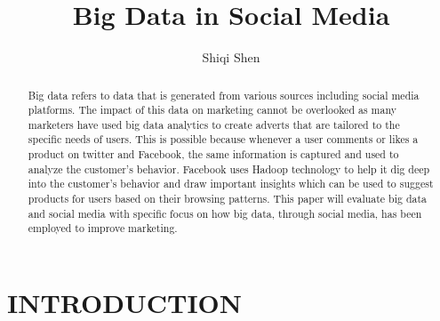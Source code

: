 \documentclass[sigconf]{acmart}
\begin{document}
\title{Big Data in Social Media}


\author{Shiqi Shen}


\begin{abstract}

   Big data refers to data that is generated from various sources including social media platforms. The impact of this data on marketing cannot be overlooked as many marketers have used big data analytics to create adverts that are tailored to the specific needs of users. This is possible because whenever a user comments or likes a product on twitter and Facebook, the same information is captured and used to analyze the customer’s behavior. Facebook uses Hadoop technology to help it dig deep into the customer’s behavior and draw important insights which can be used to suggest products for users based on their browsing patterns. This paper will evaluate big data and social media with specific focus on how big data, through social media, has been employed to improve marketing. 
    
\end{abstract}


\maketitle

\section{INTRODUCTION}
\end{document}
